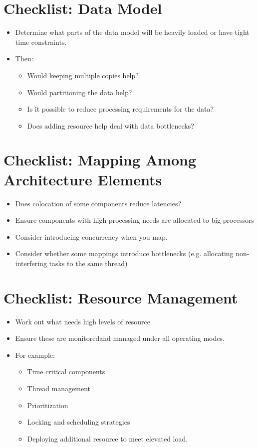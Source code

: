 \documentclass{report}
\begin{document}
\section{Checklist: Data Model}
\begin{itemize}
\item{Determine what parts of the data model will be heavily loaded or have tight time constraints.}
\item{Then:
\begin{itemize}
\item{Would keeping multiple copies help?}
\item{Would partitioning the data help?}
\item{Is it possible to reduce processing requirements for the data?}
\item{Does adding resource help deal with data bottlenecks?}
\end{itemize}}
\end{itemize}

\section{Checklist: Mapping Among Architecture Elements }
\begin{itemize}
\item{Does colocation of some components reduce latencies?}
\item{Ensure components with high processing needs are allocated to big processors}
\item{Consider introducing concurrency when you map.}
\item{Consider whether some mappings introduce bottlenecks (e.g. allocating non-interfering tasks to the same thread)}
\end{itemize}

\section{Checklist: Resource Management}
\begin{itemize}
\item{Work out what needs high levels of resource}
\item{Ensure these are monitoredand managed under all operating modes.}
\item{For example:
\begin{itemize}
\item{Time critical components}
\item{Thread management}
\item{Prioritization}
\item{Locking and scheduling strategies}
\item{Deploying additional resource to meet elevated load.}
\end{itemize}
}
\end{itemize}
\end{document}

